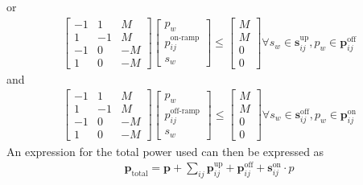 or 
\begin{equation}\begin{aligned} 
	\begin{bmatrix}
		-1 & 1 & M \\
		1  & -1 & M \\
		-1 & 0 & -M \\
		1 & 0 & -M 
		\end{bmatrix}	\begin{bmatrix} p_w \\ p_{ij}^{\text{on-ramp}} \\ s_w\end{bmatrix}  \le \begin{bmatrix} M \\ M \\ 0 \\ 0\end{bmatrix}\forall s_w \in \mathbf{s}_{ij}^{\text{up}}, p_w \in \mathbf{p}_{ij}^{\text{off}}
\end{aligned}\end{equation}
and
\begin{equation}\begin{aligned} 
	\begin{bmatrix}
		-1 & 1 & M \\
		1  & -1 & M \\
		-1 & 0 & -M \\
		1 & 0 & -M 
		\end{bmatrix}	\begin{bmatrix} p_w \\ p_{ij}^{\text{off-ramp}} \\ s_w\end{bmatrix} \le \begin{bmatrix} M \\ M \\ 0 \\ 0\end{bmatrix}\forall s_w \in \mathbf{s}_{ij}^{\text{off}}, p_w \in \mathbf{p}_{ij}^{\text{on}}
\end{aligned}\end{equation} 
An expression for the total power used can then be expressed as
\begin{equation}
	\begin{aligned}
		\mathbf{p}_{\text{total}} = \mathbf{p} + \sum_{ij} \mathbf{p}^{\text{up}}_{ij} + \mathbf{p}^{\text{off}}_{ij} + \mathbf{s}^{\text{on}}_{ij}\cdot p
	\end{aligned}
\end{equation}
